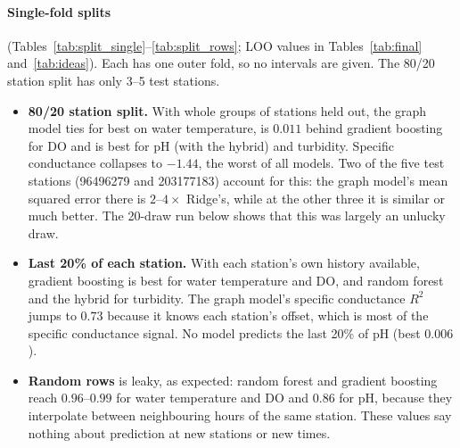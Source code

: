 \documentclass[11pt]{article}
\begin{document}
\paragraph{Single-fold splits} (Tables~\ref{tab:split_single}--\ref{tab:split_rows}; LOO values in Tables~\ref{tab:final} and~\ref{tab:ideas}). Each has one outer fold, so no intervals are
given. The 80/20 station split has only 3--5 test stations.
\begin{itemize}
  \item \textbf{80/20 station split.} With whole groups of stations held out, the graph model ties
        for best on water temperature, is $0.011$ behind gradient boosting for DO and is best for pH
        (with the hybrid) and turbidity. Specific conductance collapses to $-1.44$, the worst of all
        models. Two of the five test stations (96496279 and 203177183) account for this: the graph
        model's mean squared error there is $2$--$4\times$ Ridge's, while at the other three it is
        similar or much better. The 20-draw run below shows that this was largely an unlucky draw.
  \item \textbf{Last 20\% of each station.} With each station's own history available, gradient
        boosting is best for water temperature and DO, and random forest and the hybrid for
        turbidity. The graph model's specific conductance $R^2$ jumps to $0.73$ because it knows
        each station's offset, which is most of the specific conductance signal. No model predicts
        the last 20\% of pH (best $0.006$).
  \item \textbf{Random rows} is leaky, as expected: random forest and gradient boosting reach
        $0.96$--$0.99$ for water temperature and DO and $0.86$ for pH, because they interpolate
        between neighbouring hours of the same station. These values say nothing about prediction at
        new stations or new times.
\end{itemize}
\end{document}
